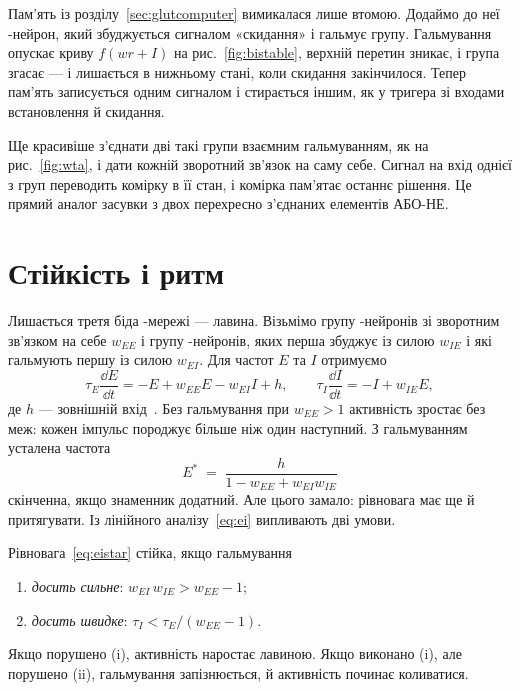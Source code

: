 Пам'ять із розділу~\ref{sec:glutcomputer} вимикалася лише втомою. Додаймо до неї -нейрон, який збуджується сигналом «скидання» і гальмує групу. Гальмування опускає криву $f(wr+I)$ на рис.~\ref{fig:bistable}, верхній перетин зникає, і група згасає --- і лишається в нижньому стані, коли скидання закінчилося. Тепер пам'ять записується одним сигналом і стирається іншим, як у тригера зі входами встановлення й скидання.

Ще красивіше з'єднати дві такі групи взаємним гальмуванням, як на рис.~\ref{fig:wta}, і дати кожній зворотний зв'язок на саму себе. Сигнал на вхід однієї з груп переводить комірку в її стан, і комірка пам'ятає останнє рішення. Це прямий аналог засувки з двох перехресно з'єднаних елементів АБО-НЕ.

\section{Стійкість і ритм}

Лишається третя біда -мережі --- лавина. Візьмімо групу -нейронів зі зворотним зв'язком на себе $w_{EE}$ і групу -нейронів, яких перша збуджує із силою $w_{IE}$ і які гальмують першу із силою $w_{EI}$. Для частот $E$ та $I$ отримуємо
\begin{equation}
\tau_E\frac{\dd E}{\dd t} = -E + w_{EE}E - w_{EI}I + h, \qquad
\tau_I\frac{\dd I}{\dd t} = -I + w_{IE}E ,
\label{eq:ei}
\end{equation}
де $h$ --- зовнішній вхід~\cite{WilsonCowan1972}. Без гальмування при $w_{EE}>1$ активність зростає без меж: кожен імпульс породжує більше ніж один наступний. З гальмуванням усталена частота
\begin{equation}
E^* \;=\; \frac{h}{1-w_{EE}+w_{EI}w_{IE}}
\label{eq:eistar}
\end{equation}
скінченна, якщо знаменник додатний. Але цього замало: рівновага має ще й притягувати. Із лінійного аналізу~\eqref{eq:ei} випливають дві умови.

\begin{keyblock}
\begin{proposition}
\label{prop:ei}
Рівновага~\eqref{eq:eistar} стійка, якщо гальмування
\begin{enumerate}
\item[(i)] \emph{досить сильне}: $w_{EI}\,w_{IE} > w_{EE}-1$;
\item[(ii)] \emph{досить швидке}: $\tau_I < \tau_E/(w_{EE}-1)$.
\end{enumerate}
Якщо порушено (i), активність наростає лавиною. Якщо виконано (i), але порушено (ii), гальмування запізнюється, й активність починає коливатися.
\end{proposition}
\end{keyblock}

